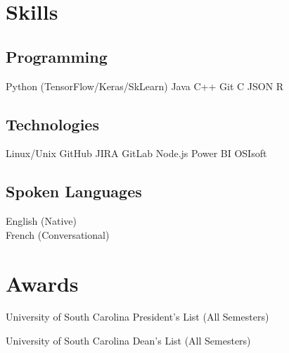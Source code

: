 \documentclass[letterpaper]{deedy-resume}
\begin{document}
\begin{minipage}[t]{0.29\textwidth}
\section{Skills}

\subsection{Programming}
Python (TensorFlow/Keras/SkLearn) Java \textbullet{}  C++ \textbullet{} Git \textbullet{} C \textbullet{} JSON \textbullet{} R 
\sectionspace 

\subsection{Technologies}
Linux/Unix \textbullet{} GitHub \textbullet{} JIRA \textbullet{} GitLab \textbullet{} Node.js \textbullet{} Power BI \textbullet{} OSIsoft
\sectionspace 

\subsection{Spoken Languages}
English (Native) \\ French (Conversational)
\sectionspace

\section{Awards}
\vspace{0.2cm}
\setlength{\leftmargini}{1em}
\begin{tightitemize}
\item University of South Carolina President's List (All Semesters)
\item University of South Carolina Dean's List (All Semesters)
\end{tightitemize}


\sectionspace

\end{minipage} 
\hfill
%
%
\end{document}
